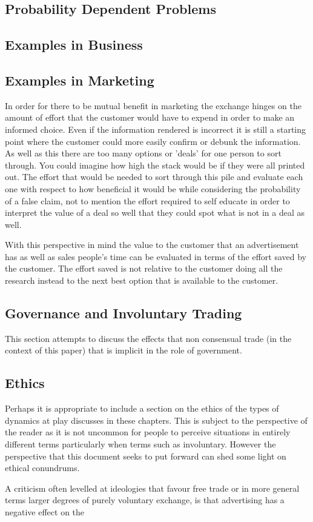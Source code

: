 \documentclass[]{article}
\begin{document}
\subsection{Probability Dependent Problems}

\subsection{Examples in Business}

\subsection{Examples in Marketing}
In order for there to be mutual benefit in marketing the exchange hinges on the amount of effort that the customer would have to expend in order to make an informed choice. Even if the information rendered is incorrect it is still a starting point where the customer could more easily confirm or debunk the information. As well as this there are too many options or 'deals' for one person to sort through. You could imagine how high the stack would be if they were all printed out. The effort that would be needed to sort through this pile and evaluate each one with respect to how beneficial it would be while considering the probability of a false claim, not to mention the effort required to self educate in order to interpret the value of a deal so well that they could spot what is not in a deal as well. 

With this perspective in mind the value to the customer that an advertisement has as well as sales people's time can be evaluated in terms of the effort saved by the customer. The effort saved is not relative to the customer doing all the research instead to the next best option that is available to the customer. 

\subsection{Governance and Involuntary Trading}
This section attempts to discuss the effects that non consensual trade (in the context of this paper) that is implicit in the role of government.

\subsection{Ethics}
Perhaps it is appropriate to include a section on the ethics of the types of dynamics at play discusses in these chapters. This is subject to the perspective of the reader as it is not uncommon for people to perceive situations in entirely different terms particularly when terms such as involuntary. However the perspective that this document seeks to put forward can shed some light on ethical conundrums. 

A criticism often levelled at ideologies that favour free trade or in more general terms larger degrees of purely voluntary exchange, is that advertising has a negative effect on the 
\end{document}
